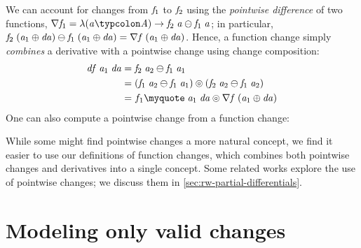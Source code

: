 We can account for changes from \ensuremath{\Varid{f}_{1}} to \ensuremath{\Varid{f}_{2}} using the
\emph{pointwise difference} of two functions, \ensuremath{\nabla \Varid{f}_{1}\mathrel{=}\lambda (\Varid{a}\typcolon\Conid{A})\to \Varid{f}_{2}\;\Varid{a}\ominus \Varid{f}_{1}\;\Varid{a}}; in particular, \ensuremath{\Varid{f}_{2}\;(\Varid{a}_{1}\oplus \Varid{da})\ominus \Varid{f}_{1}\;(\Varid{a}_{1}\oplus \Varid{da})\mathrel{=}\nabla \Varid{f}\;(\Varid{a}_{1}\oplus \Varid{da})}. Hence, a
function change simply \emph{combines} a derivative with a
pointwise change using change composition:
%
%
%
\begin{equation}
\begin{aligned}
\label{eq:pointwise-rewrite}
\ensuremath{\Varid{df}\;\Varid{a}_{1}\;\Varid{da}} & = \ensuremath{\Varid{f}_{2}\;\Varid{a}_{2}\ominus \Varid{f}_{1}\;\Varid{a}_{1}}\\
           & = \ensuremath{(\Varid{f}_{1}\;\Varid{a}_{2}\ominus \Varid{f}_{1}\;\Varid{a}_{1})\circledcirc(\Varid{f}_{2}\;\Varid{a}_{2}\ominus \Varid{f}_{1}\;\Varid{a}_{2})}\\
           & = \ensuremath{f_{1}\myquote\;\Varid{a}_{1}\;\Varid{da}\circledcirc\nabla \Varid{f}\;(\Varid{a}_{1}\oplus \Varid{da})}
\end{aligned}
\end{equation}
One can also compute a pointwise change from a function change:
\begin{hscode}\SaveRestoreHook
{}%
%
%
\>[3]{}\nabla\;\;\mathrel{=}\;\;\<[E]%
\ColumnHook
\end{hscode}\resethooks

While some might find pointwise changes a more natural concept,
we find it easier to use our definitions of function changes,
which combines both pointwise changes and derivatives into a
single concept.
Some related works explore the use of pointwise changes; we discuss them in
\cref{sec:rw-partial-differentials}.

\section{Modeling only valid changes}
\label{sec:alt-change-validity}
\newcommand{\ilcA}{ILC'14}
\newcommand{\ilcB}{ILC'17}

